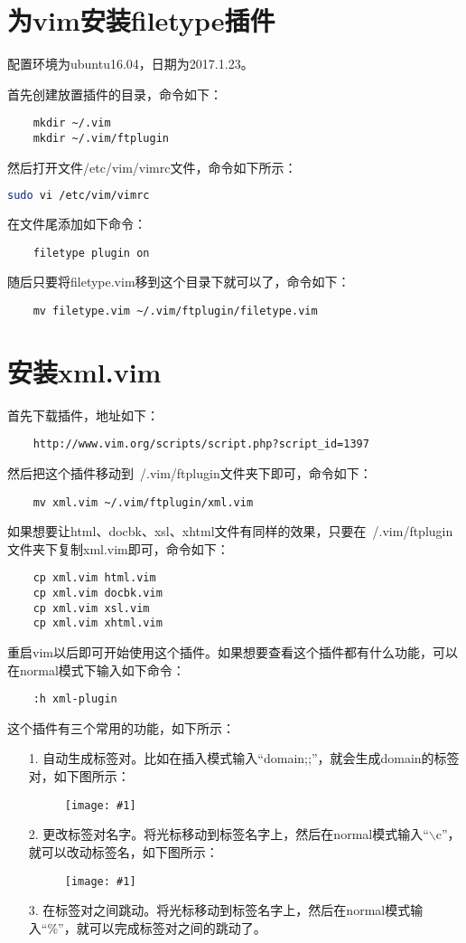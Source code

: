 \documentclass[a4paper,left=2.5cm,right=2.5cm,11pt]{article}
\newcommand{\fic}[1]{\begin{figure}[H]
		\center
		\texttt{[image: \#1]}
	\end{figure}}
\begin{document}
\tableofcontents

\clearpage

\section{为vim安装filetype插件}
	配置环境为ubuntu16.04，日期为2017.1.23。\par

	首先创建放置插件的目录，命令如下：
	\begin{lstlisting}
	mkdir ~/.vim
	mkdir ~/.vim/ftplugin
	\end{lstlisting}

	然后打开文件/etc/vim/vimrc文件，命令如下所示：
	\begin{lstlisting}[language = bash]
	sudo vi /etc/vim/vimrc
	\end{lstlisting}

	在文件尾添加如下命令：
	\begin{lstlisting}
	filetype plugin on
	\end{lstlisting}

	随后只要将filetype.vim移到这个目录下就可以了，命令如下：
	\begin{lstlisting}
	mv filetype.vim ~/.vim/ftplugin/filetype.vim
	\end{lstlisting}

\section{安装xml.vim}
	首先下载插件，地址如下：
	\begin{lstlisting}
	http://www.vim.org/scripts/script.php?script_id=1397
	\end{lstlisting}

	然后把这个插件移动到~/.vim/ftplugin文件夹下即可，命令如下：
	\begin{lstlisting}
	mv xml.vim ~/.vim/ftplugin/xml.vim
	\end{lstlisting}

	如果想要让html、docbk、xsl、xhtml文件有同样的效果，只要在~/.vim/ftplugin文件夹下复制xml.vim即可，命令如下：
	\begin{lstlisting}
	cp xml.vim html.vim
	cp xml.vim docbk.vim
	cp xml.vim xsl.vim
	cp xml.vim xhtml.vim
	\end{lstlisting}

	重启vim以后即可开始使用这个插件。如果想要查看这个插件都有什么功能，可以在normal模式下输入如下命令：
	\begin{lstlisting}
	:h xml-plugin
	\end{lstlisting}

	这个插件有三个常用的功能，如下所示：
	\begin{itemize}
		\item[1.] 自动生成标签对。比如在插入模式输入“domain;;”，就会生成domain的标签对，如下图所示：
		\fic{1.png}
		\item[2.] 更改标签对名字。将光标移动到标签名字上，然后在normal模式输入“$\backslash$c”，就可以改动标签名，如下图所示：
		\fic{2.png}
		\item[3.] 在标签对之间跳动。将光标移动到标签名字上，然后在normal模式输入“\%”，就可以完成标签对之间的跳动了。
	\end{itemize}
\end{document}
